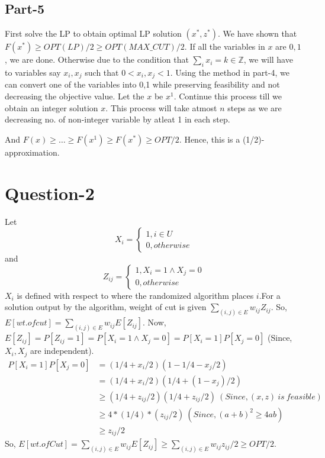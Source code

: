 \documentclass{article}
\begin{document}
\subsection{Part-5}
First solve the LP to obtain optimal LP solution $(x^*, z^*)$. We have shown that $F(x^*) \geq OPT(LP)/2 \geq OPT(MAX\_CUT)/2$. If all the variables in $x$ are $0,1$, we are done. Otherwise due to the condition that $\sum_i{x_i} = k \in \mathbb{Z}$, we will have to variables say $x_i, x_j$ such that $0 < x_i, x_j < 1$. Using the method in part-4, we can convert one of the variables into 0,1 while preserving feasibility and not decreasing the objective value. Let the $x$ be $x^1$. Continue this process till we obtain an integer solution $x$. This process will take atmost $n$ steps as we are decreasing no. of non-integer variable by atleat 1 in each step.

And
$F(x) \geq \ldots \geq F(x^1) \geq F(x^*) \geq OPT/2$. Hence, this is a (1/2)-approximation.
\section{Question-2}
Let
\begin{equation*}
    X_i = \begin{cases}1, i \in U\\ 0, otherwise\end{cases}
\end{equation*}
and
\begin{equation*}
    Z_{ij} = \begin{cases}1, X_i = 1 \land X_j = 0\\ 0, otherwise\end{cases}
\end{equation*}
$X_i$ is defined with respect to where the randomized algorithm places $i$.For a solution output by the algorithm, weight of cut is given $\sum_{(i,j) \in E}w_{ij}Z_{ij}$. So, $E[wt. of cut] = \sum_{(i,j)\in E}w_{ij}E[Z_{ij}]$. Now, $E[Z_{ij}] = P[Z_{ij} = 1] = P[X_i = 1 \land X_j = 0] = P[X_i = 1]P[X_j = 0]$ (Since, $X_i, X_j$ are independent).
\begin{align*}
    P[X_i = 1]P[X_j = 0] &= (1/4 + x_i/2)(1 - 1/4 - x_j/2)\\
    &= (1/4 + x_i/2)(1/4 + (1 - x_j)/2)\\
    &\geq (1/4 + z_{ij}/2)(1/4 + z_{ij}/2)\ (Since, (x,z)\ is\ feasible)\\
    &\geq 4*(1/4)*(z_{ij}/2)\ (Since, (a+b)^2 \geq 4ab)\\
    &\geq z_{ij}/2
\end{align*}
So, $E[wt. of Cut] = \sum_{(i,j)\in E}w_{ij}E[Z_{ij}] \geq \sum_{(i,j) \in E}w_{ij}z_{ij}/2 \geq OPT/2$. 
\end{document}
